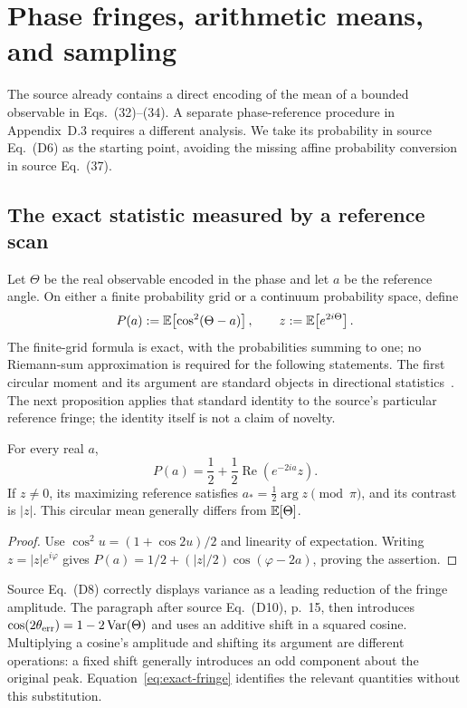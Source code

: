 \section{Phase fringes, arithmetic means, and sampling}
\label{sec:readout}

The source already contains a direct encoding of the mean of a bounded
observable in Eqs.~(32)--(34). A separate phase-reference procedure in
Appendix~D.3 requires a different analysis. We take its probability in
source Eq.~(D6) as the starting point, avoiding the missing affine
probability conversion in source Eq.~(37).

\subsection{The exact statistic measured by a reference scan}
Let $\Theta$ be the real observable encoded in the phase and let $a$ be
the reference angle. On either a finite probability grid or a continuum
probability space, define
\begin{equation}
 P(a):=\mathbb E\!\left[\cos^2(\Theta-a)\right],\qquad z:=\mathbb E\!\left[e^{2i\Theta}\right].
 \label{eq:phase-statistic}
\end{equation}
The finite-grid formula is exact, with the probabilities summing to one;
no Riemann-sum approximation is required for the following statements.
The first circular moment and its argument are standard objects in
directional statistics~\cite{directional}. The next proposition applies
that standard identity to the source's particular reference fringe; the
identity itself is not a claim of novelty.

\begin{proposition}
\label{prop:fringe}
For every real $a$,
\begin{equation}
 P(a)=\frac12+\frac12\operatorname{Re}(e^{-2ia}z).
 \label{eq:exact-fringe}
\end{equation}
If $z\ne0$, its maximizing reference satisfies
$a_*=\tfrac12\arg z\pmod\pi$, and its contrast is $|z|$.
This circular mean generally differs from $\mathbb E\!\left[\Theta\right]$.
\end{proposition}

\begin{proof}
Use $\cos^2u=(1+\cos2u)/2$ and linearity of expectation.
Writing $z=|z|e^{i\varphi}$ gives
$P(a)=1/2+(|z|/2)\cos(\varphi-2a)$, proving the assertion.
\end{proof}

Source Eq.~(D8) correctly displays variance as a leading reduction of the
fringe amplitude. The paragraph after source Eq.~(D10), p.~15, then
introduces $\cos(2\theta_{\rm err})=1-2\operatorname{Var}(\Theta)$ and
uses an additive shift in a squared cosine. Multiplying a cosine's
amplitude and shifting its argument are different operations: a fixed
shift generally introduces an odd component about the original peak.
Equation~\eqref{eq:exact-fringe} identifies the relevant quantities without
this substitution.

